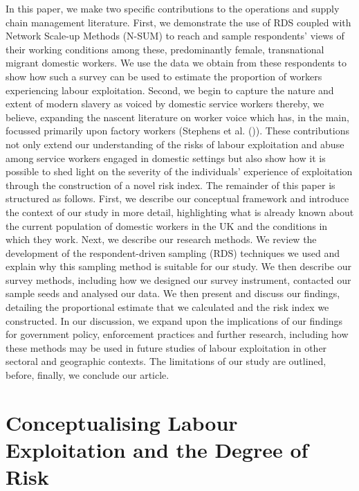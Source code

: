 \documentclass[
  12pt,
]{article}
\theoremstyle{plain}
\theoremstyle{definition}
\begin{document}
In this paper, we make two specific contributions to the operations and
supply chain management literature. First, we demonstrate the use of RDS
coupled with Network Scale-up Methods (N-SUM) to reach and sample
respondents' views of their working conditions among these,
predominantly female, transnational migrant domestic workers. We use the
data we obtain from these respondents to show how such a survey can be
used to estimate the proportion of workers experiencing labour
exploitation. Second, we begin to capture the nature and extent of
modern slavery as voiced by domestic service workers thereby, we
believe, expanding the nascent literature on worker voice which has, in
the main, focussed primarily upon factory workers (Stephens et al.
()). These contributions
not only extend our understanding of the risks of labour exploitation
and abuse among service workers engaged in domestic settings but also
show how it is possible to shed light on the severity of the
individuals' experience of exploitation through the construction of a
novel risk index. The remainder of this paper is structured as follows.
First, we describe our conceptual framework and introduce the context of
our study in more detail, highlighting what is already known about the
current population of domestic workers in the UK and the conditions in
which they work. Next, we describe our research methods. We review the
development of the respondent-driven sampling (RDS) techniques we used
and explain why this sampling method is suitable for our study. We then
describe our survey methods, including how we designed our survey
instrument, contacted our sample seeds and analysed our data. We then
present and discuss our findings, detailing the proportional estimate
that we calculated and the risk index we constructed. In our discussion,
we expand upon the implications of our findings for government policy,
enforcement practices and further research, including how these methods
may be used in future studies of labour exploitation in other sectoral
and geographic contexts. The limitations of our study are outlined,
before, finally, we conclude our article.

\section{Conceptualising Labour Exploitation and the Degree of
Risk}\label{conceptualising-labour-exploitation-and-the-degree-of-risk}
\end{document}
